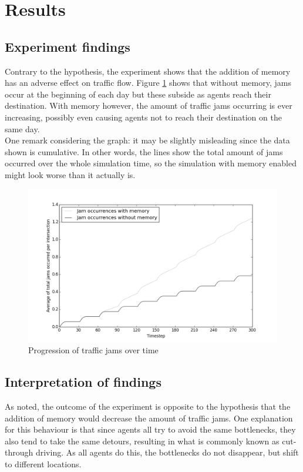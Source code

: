 \documentclass[a4paper,hidelinks]{article}
\begin{document}
\section{Results}
\subsection{Experiment findings}
Contrary to the hypothesis, the experiment shows that the addition of memory has an adverse effect on traffic flow. Figure \ref{fig:jam-progression} shows that without memory, jams occur at the beginning of each day but these subside as agents reach their destination. With memory however, the amount of traffic jams occurring is ever increasing, possibly even causing agents not to reach their destination on the same day. \\
One remark considering the graph: it may be slightly misleading since the data shown is cumulative. In other words, the lines show the total amount of jams occurred over the whole simulation time, so the simulation with memory enabled might look worse than it actually is.

\begin{figure}[ht!]
\centering
\includegraphics[width = 0.7\linewidth]{100sims-mem-vs-nomem}
\caption{Progression of traffic jams over time \label{fig:jam-progression}}
\end{figure} 

\subsection{Interpretation of findings}
As noted, the outcome of the experiment is opposite to the hypothesis that the addition of memory would decrease the amount of traffic jams. One explanation for this behaviour is that since agents all try to avoid the same bottlenecks, they also tend to take the same detours, resulting in what is commonly known as cut-through driving. As all agents do this, the bottlenecks do not disappear, but shift to different locations.
\end{document}
